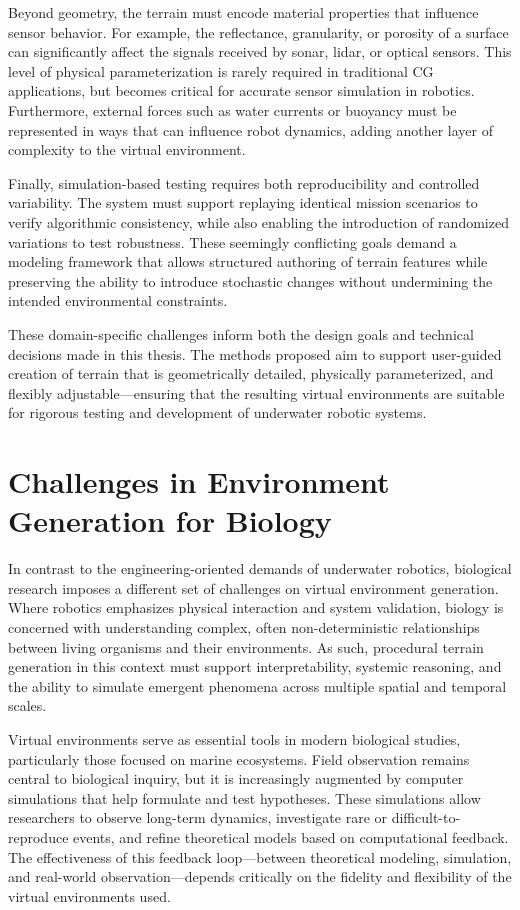 Beyond geometry, the terrain must encode material properties that influence sensor behavior. For example, the reflectance, granularity, or porosity of a surface can significantly affect the signals received by sonar, lidar, or optical sensors. This level of physical parameterization is rarely required in traditional CG applications, but becomes critical for accurate sensor simulation in robotics. Furthermore, external forces such as water currents or buoyancy must be represented in ways that can influence robot dynamics, adding another layer of complexity to the virtual environment.

Finally, simulation-based testing requires both reproducibility and controlled variability. The system must support replaying identical mission scenarios to verify algorithmic consistency, while also enabling the introduction of randomized variations to test robustness. These seemingly conflicting goals demand a modeling framework that allows structured authoring of terrain features while preserving the ability to introduce stochastic changes without undermining the intended environmental constraints.

These domain-specific challenges inform both the design goals and technical decisions made in this thesis. The methods proposed aim to support user-guided creation of terrain that is geometrically detailed, physically parameterized, and flexibly adjustable—ensuring that the resulting virtual environments are suitable for rigorous testing and development of underwater robotic systems.

\section{Challenges in Environment Generation for Biology}

In contrast to the engineering-oriented demands of underwater robotics, biological research imposes a different set of challenges on virtual environment generation. Where robotics emphasizes physical interaction and system validation, biology is concerned with understanding complex, often non-deterministic relationships between living organisms and their environments. As such, procedural terrain generation in this context must support interpretability, systemic reasoning, and the ability to simulate emergent phenomena across multiple spatial and temporal scales.

Virtual environments serve as essential tools in modern biological studies, particularly those focused on marine ecosystems. Field observation remains central to biological inquiry, but it is increasingly augmented by computer simulations that help formulate and test hypotheses. These simulations allow researchers to observe long-term dynamics, investigate rare or difficult-to-reproduce events, and refine theoretical models based on computational feedback. The effectiveness of this feedback loop—between theoretical modeling, simulation, and real-world observation—depends critically on the fidelity and flexibility of the virtual environments used.

